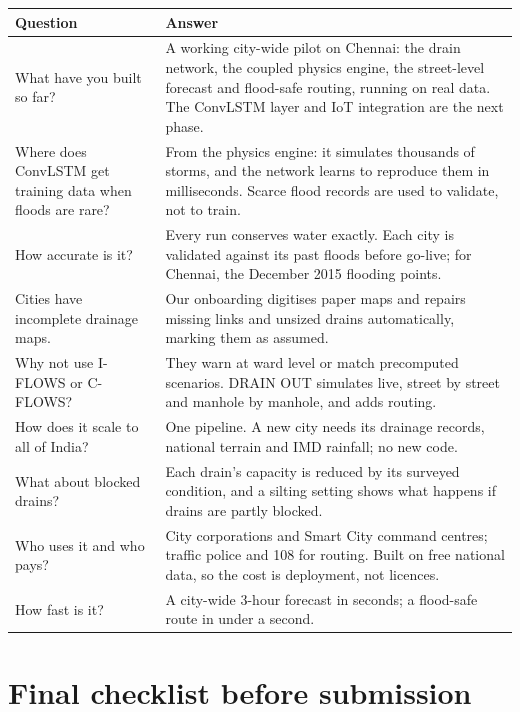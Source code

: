 \documentclass[11pt,a4paper]{article}
\begin{document}
{\small
\begin{longtable}{@{}p{5.0cm}p{11.3cm}@{}}
\toprule
\textbf{Question} & \textbf{Answer}\\
\midrule\endhead
What have you built so far? & A working city-wide pilot on Chennai: the drain network, the
  coupled physics engine, the street-level forecast and flood-safe routing, running on real
  data. The ConvLSTM layer and IoT integration are the next phase.\\
Where does ConvLSTM get training data when floods are rare? & From the physics engine: it
  simulates thousands of storms, and the network learns to reproduce them in milliseconds.
  Scarce flood records are used to validate, not to train.\\
How accurate is it? & Every run conserves water exactly. Each city is validated against its
  past floods before go-live; for Chennai, the December 2015 flooding points.\\
Cities have incomplete drainage maps. & Our onboarding digitises paper maps and repairs
  missing links and unsized drains automatically, marking them as assumed.\\
Why not use I-FLOWS or C-FLOWS? & They warn at ward level or match precomputed scenarios.
  DRAIN OUT simulates live, street by street and manhole by manhole, and adds routing.\\
How does it scale to all of India? & One pipeline. A new city needs its drainage records,
  national terrain and IMD rainfall; no new code.\\
What about blocked drains? & Each drain's capacity is reduced by its surveyed condition, and
  a silting setting shows what happens if drains are partly blocked.\\
Who uses it and who pays? & City corporations and Smart City command centres; traffic police
  and 108 for routing. Built on free national data, so the cost is deployment, not licences.\\
How fast is it? & A city-wide 3-hour forecast in seconds; a flood-safe route in under a
  second.\\
\bottomrule
\end{longtable}}

\section{Final checklist before submission}
\end{document}
